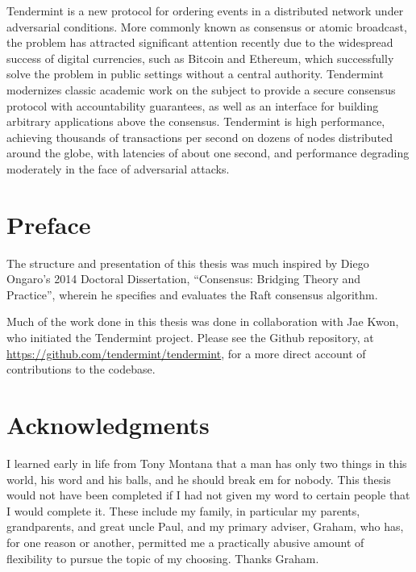 \vspace{0.9cm}
Tendermint is a new protocol for ordering events in a distributed network under adversarial conditions.
More commonly known as consensus or atomic broadcast, the problem has attracted significant attention
recently due to the widespread success of digital currencies, such as Bitcoin and Ethereum,
which successfully solve the problem in public settings without a central authority.
Tendermint modernizes classic academic work on the subject to provide a secure consensus protocol with 
accountability guarantees, as well as an interface for building arbitrary applications above the consensus.
Tendermint is high performance, achieving thousands of transactions per second on dozens of nodes distributed around the globe,
with latencies of about one second, and performance degrading moderately in the face of adversarial attacks.

\clearpage

\thispagestyle{plain}
\par\vspace*{.35\textheight}{\centering Dedicated to Theda. \par}

\chapter*{Preface}
The structure and presentation of this thesis was much inspired by Diego Ongaro's 2014 Doctoral Dissertation, 
``Consensus: Bridging Theory and Practice'', wherein he specifies and evaluates the Raft consensus algorithm.

Much of the work done in this thesis was done in collaboration with Jae Kwon, who initiated the Tendermint project.
Please see the Github repository, at \url{https://github.com/tendermint/tendermint}, for a more direct account of contributions to the codebase.


\chapter*{Acknowledgments}
I learned early in life from Tony Montana that a man has only two things in this world, his word and his balls, and he should break em for nobody.
This thesis would not have been completed if I had not given my word to certain people that I would complete it.
These include my family, in particular my parents, grandparents, and great uncle Paul, and my primary adviser, Graham,
who has, for one reason or another, permitted me a practically abusive amount of flexibility to pursue the topic of my choosing.
Thanks Graham.

